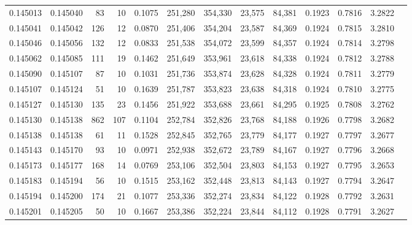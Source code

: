 \begin{tabular}{rrrrrrrrrrrrr}
0.145013 & 0.145040 &    83 &  10 &                                     0.1075 & 251,280 & 354,330 &  23,575 &  84,381 & 0.1923 & 0.7816 & 3.2822 \\
0.145041 & 0.145042 &   126 &  12 &                                     0.0870 & 251,406 & 354,204 &  23,587 &  84,369 & 0.1924 & 0.7815 & 3.2810 \\
0.145046 & 0.145056 &   132 &  12 &                                     0.0833 & 251,538 & 354,072 &  23,599 &  84,357 & 0.1924 & 0.7814 & 3.2798 \\
0.145062 & 0.145085 &   111 &  19 &                                     0.1462 & 251,649 & 353,961 &  23,618 &  84,338 & 0.1924 & 0.7812 & 3.2788 \\
0.145090 & 0.145107 &    87 &  10 &                                     0.1031 & 251,736 & 353,874 &  23,628 &  84,328 & 0.1924 & 0.7811 & 3.2779 \\
0.145107 & 0.145124 &    51 &  10 &                                     0.1639 & 251,787 & 353,823 &  23,638 &  84,318 & 0.1924 & 0.7810 & 3.2775 \\
0.145127 & 0.145130 &   135 &  23 &                                     0.1456 & 251,922 & 353,688 &  23,661 &  84,295 & 0.1925 & 0.7808 & 3.2762 \\
0.145130 & 0.145138 &   862 & 107 &                                     0.1104 & 252,784 & 352,826 &  23,768 &  84,188 & 0.1926 & 0.7798 & 3.2682 \\
0.145138 & 0.145138 &    61 &  11 &                                     0.1528 & 252,845 & 352,765 &  23,779 &  84,177 & 0.1927 & 0.7797 & 3.2677 \\
0.145143 & 0.145170 &    93 &  10 &                                     0.0971 & 252,938 & 352,672 &  23,789 &  84,167 & 0.1927 & 0.7796 & 3.2668 \\
0.145173 & 0.145177 &   168 &  14 &                                     0.0769 & 253,106 & 352,504 &  23,803 &  84,153 & 0.1927 & 0.7795 & 3.2653 \\
0.145183 & 0.145194 &    56 &  10 &                                     0.1515 & 253,162 & 352,448 &  23,813 &  84,143 & 0.1927 & 0.7794 & 3.2647 \\
0.145194 & 0.145200 &   174 &  21 &                                     0.1077 & 253,336 & 352,274 &  23,834 &  84,122 & 0.1928 & 0.7792 & 3.2631 \\
0.145201 & 0.145205 &    50 &  10 &                                     0.1667 & 253,386 & 352,224 &  23,844 &  84,112 & 0.1928 & 0.7791 & 3.2627 \\

\end{tabular}
